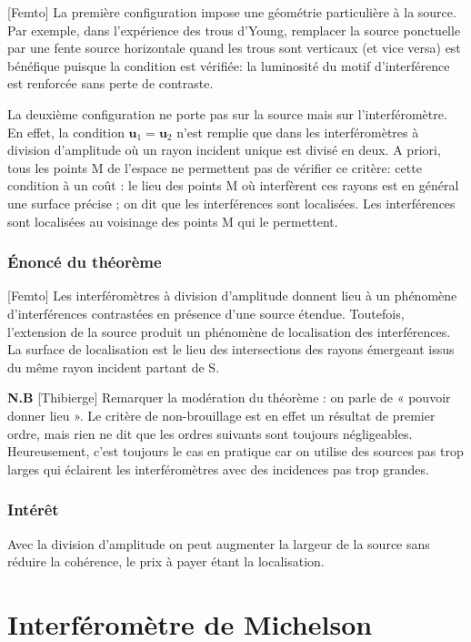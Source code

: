 \documentclass[11pt]{report}
\numberwithin{figure}{section}
\numberwithin{equation}{section}
\numberwithin{table}{section}
\newcommand{\1}{\boldsymbol{1}}
\renewcommand{\u}{\boldsymbol{u}}
\begin{document}
[Femto]  La première configuration impose une géométrie particulière à la source. Par exemple, dans l'expérience des trous d'Young, remplacer la source ponctuelle par une fente source horizontale quand les trous sont verticaux (et vice versa) est bénéfique puisque la condition est vérifiée: la luminosité du motif d'interférence est renforcée sans perte de contraste. 

La deuxième configuration ne porte pas sur la source mais sur l'interféromètre. En effet, la condition $\u_1 = \u_2$ n'est remplie que dans les interféromètres à division d'amplitude où un rayon incident unique est divisé en deux. A priori, tous les points M de l’espace ne permettent pas de vérifier ce critère: cette condition à un coût : le lieu des points M où interfèrent ces rayons est en général une surface précise ; on dit que les interférences sont localisées. Les interférences sont localisées au voisinage des points M qui le permettent.

\subsubsection{Énoncé du théorème}

[Femto] Les interféromètres à division d'amplitude donnent lieu à un phénomène d'interférences contrastées en présence d'une source étendue. Toutefois, l'extension de la source produit un phénomène de localisation des interférences. La surface de localisation est le lieu des intersections des rayons émergeant issus du même rayon incident partant de S.

\textbf{N.B} [Thibierge] Remarquer la modération du théorème : on parle de « pouvoir donner lieu ». Le critère de non-brouillage est en effet un résultat de premier ordre, mais rien ne dit que les ordres suivants sont toujours négligeables. Heureusement, c’est toujours le cas en pratique car on utilise des sources pas trop larges qui éclairent les interféromètres avec des incidences pas trop grandes.

\subsubsection{Intérêt}

Avec la division d'amplitude on peut augmenter la largeur de la source sans
réduire la cohérence, le prix à payer étant la localisation.


\section{Interféromètre de Michelson}
\end{document}

